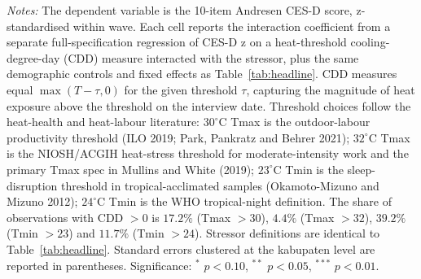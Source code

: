 \begin{table}[!htbp]
\begin{threeparttable}
\begin{tabular}{lccc}
\bottomrule
\end{tabular}
\begin{tablenotes}[flushleft]
\footnotesize
\item \textit{Notes:} The dependent variable is the 10-item Andresen CES-D score, z-standardised within wave. Each cell reports the interaction coefficient from a separate full-specification regression of CES-D z on a heat-threshold cooling-degree-day (CDD) measure interacted with the stressor, plus the same demographic controls and fixed effects as Table~\ref{tab:headline}. CDD measures equal $\max(T - \tau, 0)$ for the given threshold $\tau$, capturing the magnitude of heat exposure above the threshold on the interview date. Threshold choices follow the heat-health and heat-labour literature: $30^{\circ}$C Tmax is the outdoor-labour productivity threshold (ILO 2019; Park, Pankratz and Behrer 2021); $32^{\circ}$C Tmax is the NIOSH/ACGIH heat-stress threshold for moderate-intensity work and the primary Tmax spec in Mullins and White (2019); $23^{\circ}$C Tmin is the sleep-disruption threshold in tropical-acclimated samples (Okamoto-Mizuno and Mizuno 2012); $24^{\circ}$C Tmin is the WHO tropical-night definition. The share of observations with CDD $> 0$ is $17.2\%$ (Tmax $> 30$), $4.4\%$ (Tmax $> 32$), $39.2\%$ (Tmin $> 23$) and $11.7\%$ (Tmin $> 24$). Stressor definitions are identical to Table~\ref{tab:headline}. Standard errors clustered at the kabupaten level are reported in parentheses. Significance: $^{*}$ $p<0.10$, $^{**}$ $p<0.05$, $^{***}$ $p<0.01$.
\end{tablenotes}
\end{threeparttable}
\end{table}
